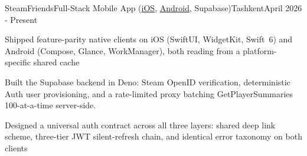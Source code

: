 \begin{resume_employer}{SteamFriends}{Full-Stack Mobile App ({\href{https://apps.apple.com/us/app/vaporfriends/id6762462173}{iOS}}, {\href{https://play.google.com/store/apps/details?id=com.ny.steam}{Android}}, Supabase)}{Tashkent}{April 2026 - Present}
\item Shipped feature-parity native clients on iOS (SwiftUI, WidgetKit, Swift 6) and Android (Compose, Glance, WorkManager), both reading from a platform-specific shared cache
\item Built the Supabase backend in Deno: Steam OpenID verification, deterministic Auth user provisioning, and a rate-limited proxy batching GetPlayerSummaries 100-at-a-time server-side.
\item Designed a universal auth contract across all three layers: shared deep link scheme, three-tier JWT silent-refresh chain, and identical error taxonomy on both clients
\end{resume_employer}
